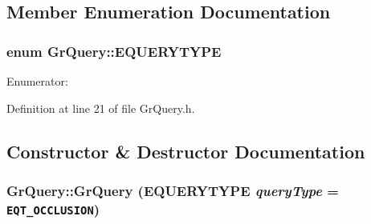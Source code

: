 \begin{CompactItemize}
\subsection{Member Enumeration Documentation}
\hypertarget{class_gr_query_932c1c9ceff8018b6f8420f282c2c38f}{
\subsubsection[{EQUERYTYPE}]{\setlength{\rightskip}{0pt plus 5cm}enum {\bf GrQuery::EQUERYTYPE}}}
\label{class_gr_query_932c1c9ceff8018b6f8420f282c2c38f}


\begin{Desc}
\item[Enumerator: ]\par
\begin{description}
\item[{\em 
\hypertarget{class_gr_query_932c1c9ceff8018b6f8420f282c2c38fdefde3fbd36578dd412eadf2f0445e98}{
EQT\_\-OCCLUSION}
\label{class_gr_query_932c1c9ceff8018b6f8420f282c2c38fdefde3fbd36578dd412eadf2f0445e98}
}]\item[{\em 
\hypertarget{class_gr_query_932c1c9ceff8018b6f8420f282c2c38f039eb3383e627e36b40a6d1f9ef00ef4}{
EQT\_\-COUNT}
\label{class_gr_query_932c1c9ceff8018b6f8420f282c2c38f039eb3383e627e36b40a6d1f9ef00ef4}
}]\end{description}
\end{Desc}



Definition at line 21 of file GrQuery.h.

\subsection{Constructor \& Destructor Documentation}
\hypertarget{class_gr_query_c0df4dcb95862062ebd6f79709cfaf61}{
\subsubsection[{GrQuery}]{\setlength{\rightskip}{0pt plus 5cm}GrQuery::GrQuery ({\bf EQUERYTYPE} {\em queryType} = {\tt EQT\_\-OCCLUSION})}}
\label{class_gr_query_c0df4dcb95862062ebd6f79709cfaf61}





\end{CompactItemize}
